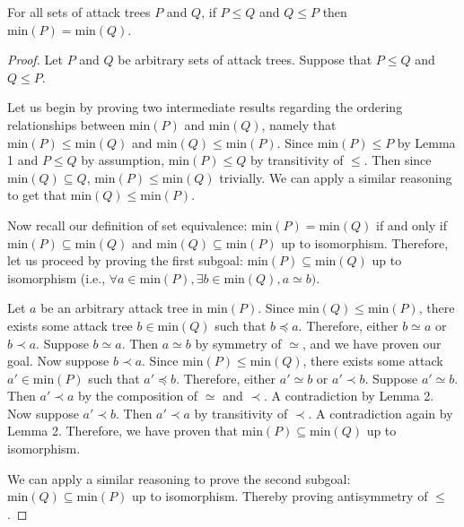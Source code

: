\documentclass[runningheads]{llncs}
\theoremstyle{definition}
\begin{document}
\begin{theorem}
  For all sets of attack trees $P$ and $Q$, if $P \le Q$ and $Q \le P$
  then $\text{min}(P) = \text{min}(Q)$. 
\end{theorem}
\begin{proof}
  Let $P$ and $Q$ be arbitrary sets of attack trees. Suppose that $P
  \le Q$ and $Q \le P$.  
  
  Let us begin by proving two intermediate results regarding the
  ordering relationships between $\text{min}(P)$ and $\text{min}(Q)$,
  namely that $\text{min}(P) \leq \text{min}(Q)$ and $\text{min}(Q)
  \leq \text{min}(P)$. Since $\text{min}(P) \leq P$ by Lemma 1 and $P
  \leq Q$ by assumption, $\text{min}(P) \leq Q$ by transitivity of
  $\leq$. Then since $\text{min}(Q) \subseteq Q$, $\text{min}(P) \leq
  \text{min}(Q)$ trivially. We can apply a similar reasoning to get
  that $\text{min}(Q) \leq \text{min}(P)$. 

  Now recall our definition of set equivalence: $\text{min}(P) =
  \text{min}(Q)$ if and only if $\text{min}(P) \subseteq
  \text{min}(Q)$ and $\text{min}(Q) \subseteq \text{min}(P)$ up to
  isomorphism. Therefore, let us proceed by proving the first subgoal:
  $\text{min}(P) \subseteq \text{min}(Q)$ up to isomorphism (i.e.,
  $\forall a \in \text{min}(P), \exists b \in \text{min}(Q), a \simeq
  b)$.  
   
  Let $a$ be an arbitrary attack tree in $\text{min}(P)$.  
  Since $\text{min}(Q) \leq \text{min}(P)$, there exists some attack
  tree $b \in \text{min}(Q)$ such that $b \preceq a$. Therefore,
  either $b \simeq a$ or $b \prec a$. Suppose $b \simeq a$. Then $a
  \simeq b$ by symmetry of $\simeq$, and we have proven our goal.
  Now suppose $b \prec a$. Since $\text{min}(P) \leq \text{min}(Q)$, 
  there exists some attack $a' \in \text{min}(P)$ such
  that $a' \preceq b$. Therefore, either $a' \simeq b$ or $a' \prec b$. 
  Suppose $a' \simeq b$. Then $a' \prec a$ by the composition of $\simeq$
  and $\prec$. A contradiction by Lemma 2. Now suppose $a' \prec b$. 
  Then $a' \prec a$ by transitivity of $\prec$. A contradiction again by 
  Lemma 2. Therefore, we have proven that 
  $\text{min}(P) \subseteq \text{min}(Q)$ up to isomorphism. 

  We can apply a similar reasoning to prove the second subgoal:
  $\text{min}(Q) \subseteq \text{min}(P)$ up to isomorphism. Thereby
  proving antisymmetry of $\leq$. 
\end{proof}
\end{document}
